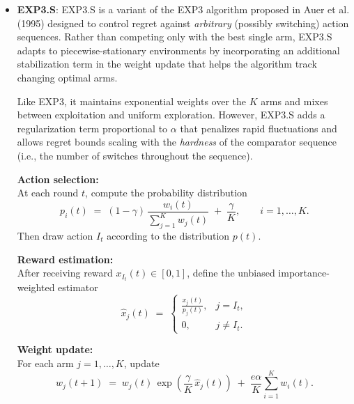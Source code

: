 \documentclass[pdflatex,sn-mathphys-num]{sn-jnl}
\theoremstyle{thmstyleone}%
\theoremstyle{thmstyletwo}%
\theoremstyle{thmstylethree}%
\begin{document}
\begin{itemize}
    Because the estimate $Q_t(i)$ places exponentially decaying weight on past
    rewards with weights proportional to $(1-\alpha)^k$ for $k$-step-old
    observations method adapts effectively to non-stationary reward
    distributions. Larger values of $\alpha$ allow faster adaptation, while
    smaller values provide greater stability.

    \item \textbf{EXP3.S}\cite{exp3s}:  
EXP3.S is a variant of the EXP3 algorithm proposed in Auer et al. (1995) \cite{exp3} designed to control regret against \emph{arbitrary} (possibly switching) action sequences.
Rather than competing only with the best single arm, EXP3.S adapts to
piecewise-stationary environments by incorporating an additional
stabilization term in the weight update that helps the algorithm track
changing optimal arms.

Like EXP3, it maintains exponential weights over the $K$ arms and mixes
between exploitation and uniform exploration.  
However, EXP3.S adds a regularization term proportional to 
$\alpha$ that penalizes rapid fluctuations and allows regret bounds
scaling with the \emph{hardness} of the comparator sequence (i.e., the number of switches throughout the sequence).

\vspace{4pt}
\textbf{Action selection:}\\
\quad At each round $t$, compute the probability distribution
\[
    p_i(t)
    \;=\;
    (1-\gamma)\,
    \frac{w_i(t)}{\sum_{j=1}^K w_j(t)}
    \;+\;
    \frac{\gamma}{K},
    \qquad i=1,\dots,K.
\]
\quad Then draw action $I_t$ according to the distribution $p(t)$.

\vspace{4pt}
\textbf{Reward estimation:}\\
After receiving reward $x_{I_t}(t) \in [0,1]$, define the unbiased
importance-weighted estimator
\[
    \widehat{x}_j(t)
    \;=\;
    \begin{cases}
        \displaystyle \frac{x_j(t)}{p_j(t)}, & j = I_t,\\[6pt]
        0, & j \neq I_t .
    \end{cases}
\]

\vspace{4pt}
\textbf{Weight update:}\\
For each arm $j = 1,\dots,K$, update
\[
    w_j(t+1)
    \;=\;
    w_j(t)\,
    \exp\!\left(\frac{\gamma}{K}\,\widehat{x}_j(t)\right)
    \;+\;
    \frac{e{\alpha}}{K}
    \sum_{i=1}^K w_i(t).
\]


\end{itemize}
\end{document}
